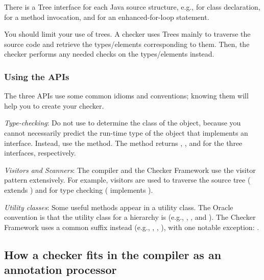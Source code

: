 There is a Tree interface for each Java source structure, e.g.,
 for class declaration, 
for a method invocation, and  for an enhanced-for-loop
statement.

You should limit your use of trees. A checker uses Trees mainly to
traverse the source code and retrieve the types/elements corresponding to
them.  Then, the checker performs any needed checks on the types/elements instead.


\subsubsection{Using the APIs\label{using-the-apis}}

The three APIs use some common idioms and conventions; knowing them will
help you to create your checker.

\emph{Type-checking}:
Do not use  to determine the class of the object,
because you cannot necessarily predict the run-time type of the object that
implements an interface.  Instead, use the  method.  The
method returns ,
, and 
for the three interfaces, respectively.

\emph{Visitors and Scanners}:
The compiler and the Checker Framework use the visitor pattern
extensively. For example, visitors are used to traverse the source tree
( extends
) and for type
checking ( implements
).

\emph{Utility classes}:
Some useful methods appear in a utility class.  The Oracle convention is that
the utility class for a  hierarchy is  (e.g.,
, , and
).  The Checker Framework uses a common
 suffix instead (e.g., ,
, ), with one
notable exception: .


\subsection{How a checker fits in the compiler as an annotation processor\label{checker-as-annotation-processor}}


